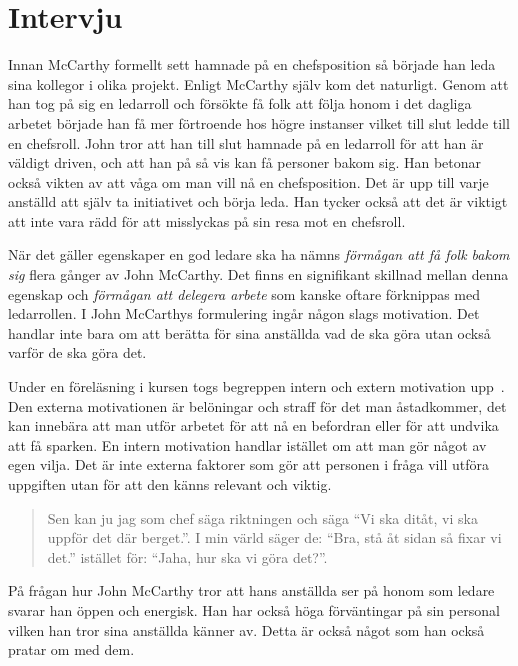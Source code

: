 \section{Intervju}
\label{sec:intervju}

Innan McCarthy formellt sett hamnade på en chefsposition så började han leda sina kollegor i olika projekt. Enligt McCarthy själv kom det naturligt. Genom att han tog på sig en ledarroll och försökte få folk att följa honom i det dagliga arbetet började han få mer förtroende hos högre instanser vilket till slut ledde till en chefsroll. John tror att han till slut hamnade på en ledarroll för att han är väldigt driven, och att han på så vis kan få personer bakom sig. Han betonar också vikten av att våga om man vill nå en chefsposition. Det är upp till varje anställd att själv ta initiativet och börja leda. Han tycker också att det är viktigt att inte vara rädd för att misslyckas på sin resa mot en chefsroll.

När det gäller egenskaper en god ledare ska ha nämns \textit{förmågan att få folk bakom sig} flera gånger av John McCarthy. Det finns en signifikant skillnad mellan denna egenskap och \textit{förmågan att delegera arbete} som kanske oftare förknippas med ledarrollen. I John McCarthys formulering ingår någon slags motivation. Det handlar inte bara om att berätta för sina anställda vad de ska göra utan också varför de ska göra det.

Under en föreläsning i kursen togs begreppen intern och extern motivation upp~\citep{motivation}. Den externa motivationen är belöningar och straff för det man åstadkommer, det kan innebära att man utför arbetet för att nå en befordran eller för att undvika att få sparken. En intern motivation handlar istället om att man gör något av egen vilja. Det är inte externa faktorer som gör att personen i fråga vill utföra uppgiften utan för att den känns relevant och viktig.

\begin{quote}
 Sen kan ju jag som chef säga riktningen och säga ``Vi ska ditåt, vi ska uppför det där berget.''. I min värld säger de: ``Bra, stå åt sidan så fixar vi det.'' istället för: ``Jaha, hur ska vi göra det?''.
\end{quote}

På frågan hur John McCarthy tror att hans anställda ser på honom som ledare svarar han öppen och energisk. Han har också höga förväntingar på sin personal vilken han tror sina anställda känner av. Detta är också något som han också pratar om med dem.

